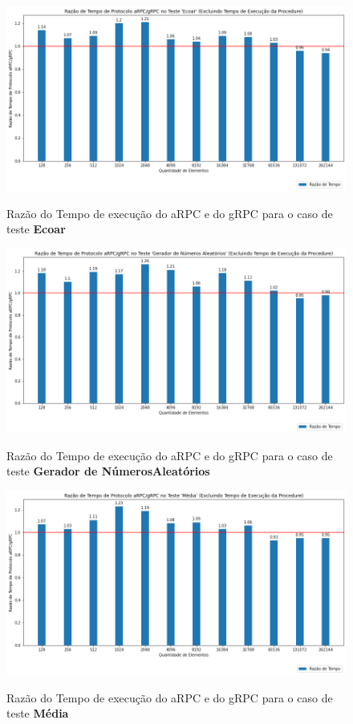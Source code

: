 \begin{figure}[!ht]
    \centering
    \caption{Razão do Tempo de execução do aRPC e do gRPC para o caso de teste \textbf{Ecoar}}
    \includegraphics[width=\textwidth]{figuras/framework/razao_tempo_execucao_largedata.png}
    \label{fig:razao_tempo_execucao_largedata}
\end{figure}

\begin{figure}[!ht]
    \centering
    \caption{Razão do Tempo de execução do aRPC e do gRPC para o caso de teste \textbf{Gerador de NúmerosAleatórios}}
    \includegraphics[width=\textwidth]{figuras/framework/razao_tempo_execucao_getrandomnumbers.png}
    \label{fig:razao_tempo_execucao_getrandomnumbers}
\end{figure}

\begin{figure}[ht]
    \centering
    \caption{Razão do Tempo de execução do aRPC e do gRPC para o caso de teste \textbf{Média}}
    \includegraphics[width=\textwidth]{figuras/framework/razao_tempo_execucao_average.png}
    \label{fig:razao_tempo_execucao_average}
\end{figure}

